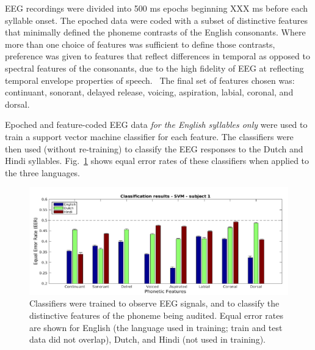 EEG recordings were divided into 500 ms epochs beginning XXX ms before
each syllable onset.
The epoched data were coded with a subset of distinctive features
that minimally defined the phoneme contrasts of the English consonants.
Where more than one choice of features was sufficient to define those
contrasts, preference was given to features that reflect differences
in temporal as opposed to spectral features of the consonants, due to
the high fidelity of EEG at reflecting temporal envelope properties of 
speech.~\cite{Liberto15} The final set of features chosen was:
continuant, sonorant, delayed release, voicing, aspiration, labial,
coronal, and dorsal.

Epoched and feature-coded EEG data {\em for the English syllables only}
were used to train a support vector machine classifier for each feature.
The classifiers were then used (without re-training) to classify the
EEG responses to the Dutch and Hindi syllables.
Fig.~\ref{fig:eeg_svm_eers} shows equal error rates of these
classifiers when applied to the three languages.

\begin{figure}
  \centerline{\includegraphics[width=5in]{../figs/diliberto_svmresults.png}}
  \caption{Classifiers were trained to observe EEG signals, and to
    classify the distinctive features of the phoneme being audited.
    Equal error rates are shown for English (the language used in
    training; train and test data did not overlap), Dutch, and Hindi
    (not used in training).}
  \label{fig:eeg_svm_eers}
\end{figure}

